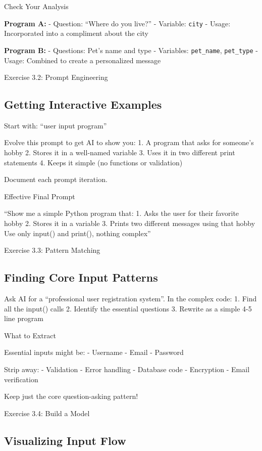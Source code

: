 \documentclass[
  letterpaper,
  DIV=11,
  numbers=noendperiod,
  oneside]{scrreprt}
\begin{document}
Check Your Analysis

\textbf{Program A:} - Question: ``Where do you live?'' - Variable:
\texttt{city} - Usage: Incorporated into a compliment about the city

\textbf{Program B:} - Questions: Pet's name and type - Variables:
\texttt{pet\_name}, \texttt{pet\_type} - Usage: Combined to create a
personalized message

Exercise 3.2: Prompt Engineering

\subsection{Getting Interactive
Examples}\label{getting-interactive-examples}

Start with: ``user input program''

Evolve this prompt to get AI to show you: 1. A program that asks for
someone's hobby 2. Stores it in a well-named variable 3. Uses it in two
different print statements 4. Keeps it simple (no functions or
validation)

Document each prompt iteration.

Effective Final Prompt

``Show me a simple Python program that: 1. Asks the user for their
favorite hobby 2. Stores it in a variable 3. Prints two different
messages using that hobby Use only input() and print(), nothing
complex''

Exercise 3.3: Pattern Matching

\subsection{Finding Core Input
Patterns}\label{finding-core-input-patterns}

Ask AI for a ``professional user registration system''. In the complex
code: 1. Find all the input() calls 2. Identify the essential questions
3. Rewrite as a simple 4-5 line program

What to Extract

Essential inputs might be: - Username - Email - Password

Strip away: - Validation - Error handling - Database code - Encryption -
Email verification

Keep just the core question-asking pattern!

Exercise 3.4: Build a Model

\subsection{Visualizing Input Flow}\label{visualizing-input-flow}
\end{document}
